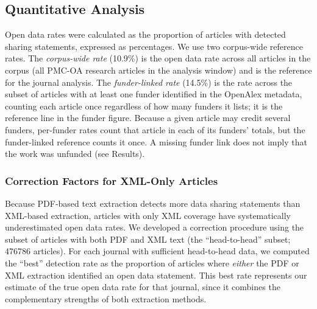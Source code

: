 \subsection{Quantitative Analysis}

Open data rates were calculated as the proportion of articles with detected sharing statements, expressed as percentages. We use two corpus-wide reference rates. The \emph{corpus-wide rate} (10.9\%) is the open data rate across all articles in the corpus (all PMC-OA research articles in the analysis window) and is the reference for the journal analysis. The \emph{funder-linked rate} (14.5\%) is the rate across the subset of articles with at least one funder identified in the OpenAlex metadata, counting each article once regardless of how many funders it lists; it is the reference line in the funder figure. Because a given article may credit several funders, per-funder rates count that article in each of its funders' totals, but the funder-linked reference counts it once. A missing funder link does not imply that the work was unfunded (see Results).

\subsubsection{Correction Factors for XML-Only Articles}

Because PDF-based text extraction detects more data sharing statements than XML-based extraction, articles with only XML coverage have systematically underestimated open data rates. We developed a correction procedure using the subset of articles with both PDF and XML text (the ``head-to-head'' subset; \num{476786} articles). For each journal with sufficient head-to-head data, we computed the ``best'' detection rate as the proportion of articles where \emph{either} the PDF or XML extraction identified an open data statement. This best rate represents our estimate of the true open data rate for that journal, since it combines the complementary strengths of both extraction methods.

